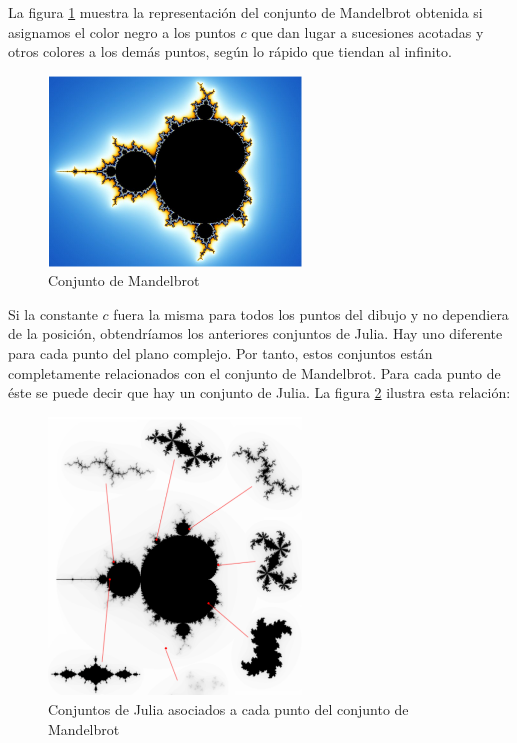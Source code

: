 La figura \ref{fig:Mandelbrot} muestra la representación del conjunto de Mandelbrot obtenida si asignamos el color negro a los puntos $c$ que dan lugar a sucesiones acotadas y otros colores a los demás puntos, según lo rápido que tiendan al infinito.

\begin{figure}[hbtp]
\centering
\includegraphics[width = 0.6\textwidth]{img/Mandelbrot_set.png}
\caption{Conjunto de Mandelbrot}
\label{fig:Mandelbrot}
\end{figure}

Si la constante $c$ fuera la misma para todos los puntos del dibujo y no dependiera de la posición, obtendríamos los anteriores conjuntos de Julia. Hay uno diferente para cada punto del plano complejo. Por tanto, estos conjuntos están completamente relacionados con el conjunto de Mandelbrot. Para cada punto de éste se puede decir que hay un conjunto de Julia. La figura \ref{fig:Mandelbrot-Julia} ilustra esta relación:

\begin{figure}[hbtp]
\centering
\includegraphics[width = 0.6\textwidth]{img/Mandelbrot-Julia.png}
\caption{Conjuntos de Julia asociados a cada punto del conjunto de Mandelbrot}
\label{fig:Mandelbrot-Julia}
\end{figure}

